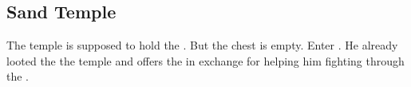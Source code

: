 \subsection{Sand Temple}
\label{map:sand_temple}

The temple is supposed to hold the . But the chest is empty. Enter . He already looted the the temple and offers the  in exchange for helping him fighting through the .
